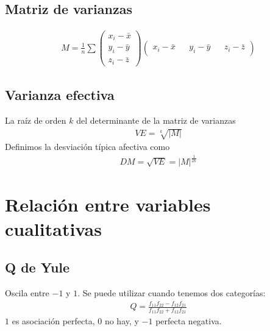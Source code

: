 \documentclass{article}
\begin{document}
\subsection{Matriz de varianzas}
\begin{equation}
    \begin{split}
        M= \frac{1}{n} \sum \begin{pmatrix}
        x_{i}-\bar{x}\\
        y_{i}-\bar{y}\\
        z_{i}-\bar{z}
        \end{pmatrix} \begin{pmatrix}
        x_{i}-\bar{x} && y_{i}-\bar{y} && z_{i}-\bar{z}
        \end{pmatrix}
    \end{split}
\end{equation}
\subsection{Varianza efectiva}
La raíz de orden $k$ del determinante de la matriz de varianzas
\begin{equation}
    \begin{split}
        VE = \sqrt[k]{|M|}
    \end{split}
\end{equation}
Definimos la desviación típica afectiva como
\begin{equation}
    \begin{split}
        DM= \sqrt{VE} = |M|^{\frac{1}{2k}}
    \end{split}
\end{equation}
\section{Relación entre variables cualitativas}
\subsection{Q de Yule}
Oscila entre $-1$ y $1$. Se puede utilizar cuando tenemos dos categorías:
\begin{equation}
    \begin{split}
        Q = \frac{f_{11}f_{22}- f_{12}f_{21}}{f_{11}f_{22}+ f_{12}f_{21}}
    \end{split}
\end{equation}
$1$ es asociación perfecta, $0$ no hay, y $-1$ perfecta negativa.
\end{document}
